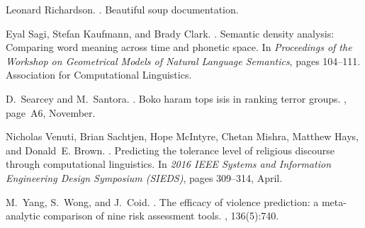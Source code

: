 \documentclass[11pt]{article}
\begin{document}
\begin{thebibliography}{}
Leonard Richardson.
.
\newblock Beautiful soup documentation.

Eyal Sagi, Stefan Kaufmann, and Brady Clark.
.
\newblock Semantic density analysis: Comparing word meaning across time and
  phonetic space.
\newblock In {\em Proceedings of the Workshop on Geometrical Models of Natural
  Language Semantics}, pages 104--111. Association for Computational
  Linguistics.

D.~Searcey and M.~Santora.
.
\newblock Boko haram tops isis in ranking terror groups.
, page~A6, November.

Nicholas Venuti, Brian Sachtjen, Hope McIntyre, Chetan Mishra, Matthew Hays,
  and Donald~E. Brown.
.
\newblock Predicting the tolerance level of religious discourse through
  computational linguistics.
\newblock In {\em 2016 IEEE Systems and Information Engineering Design
  Symposium (SIEDS)}, pages 309--314, April.

M.~Yang, S.~Wong, and J.~Coid.
.
\newblock The efficacy of violence prediction: a meta-analytic comparison of
  nine risk assessment tools.
, 136(5):740.

\end{thebibliography}
\end{document}
